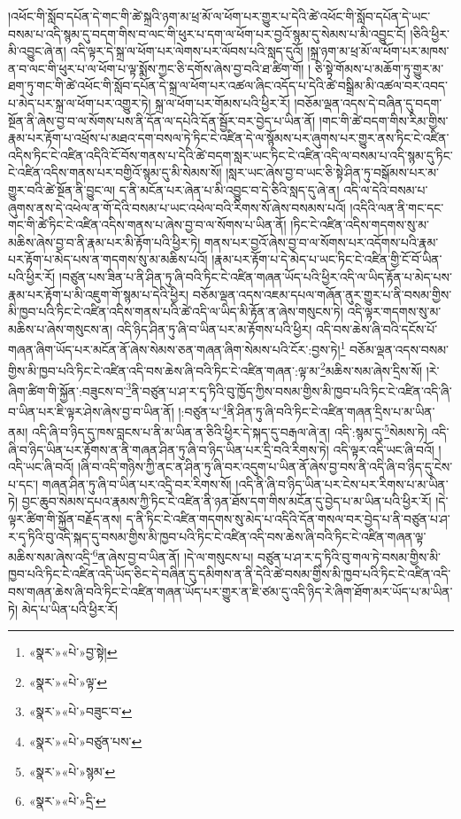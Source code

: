 །འཕོང་གི་སློབ་དཔོན་དེ་གང་གི་ཚེ་སྐྲའི་ཉག་མ་ཕྲ་མོ་ལ་ཕོག་པར་གྱུར་པ་དེའི་ཚེ་འཕོང་གི་སློབ་དཔོན་དེ་ཡང་བསམ་པ་འདི་སྙམ་དུ་བདག་གིས་བ་ལང་གི་ཕུར་པ་དག་ལ་ཕོག་པར་བྱའོ་སྙམ་དུ་སེམས་པ་མི་འབྱུང་ངོ། །ཅིའི་ཕྱིར་མི་འབྱུང་ཞེ་ན། འདི་ལྟར་དེ་སྐྲ་ལ་ཕོག་པར་ལེགས་པར་ལོབས་པའི་སླད་དུའོ། །སྐྲ་ཉག་མ་ཕྲ་མོ་ལ་ཕོག་པར་མཁས་ན་བ་ལང་གི་ཕུར་པ་ལ་ཕོག་པ་ལྟ་སྨོས་ཀྱང་ཅི་དགོས་ཞེས་བྱ་བའི་ཐ་ཚིག་གོ། །
ཅི་སྟེ་གོམས་པ་མཆོག་ཏུ་གྱུར་མ་ཐག་ཏུ་གང་གི་ཚེ་འཕོང་གི་སློབ་དཔོན་དེ་སྐྲ་ལ་ཕོག་པར་འཚལ་ཞིང་འདོད་པ་དེའི་ཚེ་བསྒྲིམ་མི་འཚལ་བར་འབད་པ་མེད་པར་སྐྲ་ལ་ཕོག་པར་འགྱུར་ཏེ། སྐྲ་ལ་ཕོག་པར་གོམས་པའི་ཕྱིར་རོ། །བཅོམ་ལྡན་འདས་དེ་བཞིན་དུ་བདག་སྔོན་ནི་ཞེས་བྱ་བ་ལ་སོགས་པས་ནི་དོན་ལ་དཔེའི་དོན་སྦྱོར་བར་བྱེད་པ་ཡིན་ནོ། །གང་གི་ཚེ་བདག་གིས་རིམ་གྱིས་རྣམ་པར་རྟོག་པ་འཕྲོས་པ་མཐའ་དག་བསལ་ཏེ་ཏིང་ངེ་འཛིན་དེ་ལ་སྙོམས་པར་ཞུགས་པར་གྱུར་ནས་ཏིང་ངེ་འཛིན་འདིས་ཏིང་ངེ་འཛིན་འདིའི་ངོ་བོས་གནས་པ་དེའི་ཚེ་བདག་སླར་ཡང་ཏིང་ངེ་འཛིན་འདི་ལ་བསམ་པ་འདི་སྙམ་དུ་ཏིང་ངེ་འཛིན་འདིས་གནས་པར་བགྱིའོ་སྙམ་དུ་མི་སེམས་སོ། །སླར་ཡང་ཞེས་བྱ་བ་ཡང་ཅི་སྟེ་ཤིན་ཏུ་བསྒོམས་པར་མ་གྱུར་བའི་ཚེ་སྔོན་ནི་བྱུང་ལ། ད་ནི་མངོན་པར་ཞེན་པ་མི་འབྱུང་བ་དེ་ཅིའི་སླད་དུ་ཞེ་ན། འདི་ལ་དེའི་བསམ་པ་ཞུགས་ནས་དེ་འཕེལ་ན་གོ་དེའི་བསམ་པ་ཡང་འཕེལ་བའི་རིགས་སོ་ཞེས་བསམས་པའོ། །འདིའི་ལན་ནི་གང་དང་གང་གི་ཚེ་ཏིང་ངེ་འཛིན་འདིས་གནས་པ་ཞེས་བྱ་བ་ལ་སོགས་པ་ཡིན་ནོ། །ཏིང་ངེ་འཛིན་འདིས་གདགས་སུ་མ་མཆིས་ཞེས་བྱ་བ་ནི་རྣམ་པར་མི་རྟོག་པའི་ཕྱིར་ཏེ། གནས་པར་བྱའོ་ཞེས་བྱ་བ་ལ་སོགས་པར་འདོགས་པའི་རྣམ་པར་རྟོག་པ་མེད་པས་ན་གདགས་སུ་མ་མཆིས་པའོ། །རྣམ་པར་རྟོག་པ་དེ་མེད་པ་ཡང་ཏིང་ངེ་འཛིན་གྱི་ངོ་བོ་ཡིན་པའི་ཕྱིར་རོ། །བཙུན་པས་ཟིན་པ་ནི་ཤིན་ཏུ་ཞི་བའི་ཏིང་ངེ་འཛིན་གཞན་ཡོད་པའི་ཕྱིར་འདི་ལ་ཡིད་རྟོན་པ་མེད་པས་རྣམ་པར་རྟོག་པ་མི་འཇུག་གོ་སྙམ་པ་དེའི་ཕྱིར། བཅོམ་ལྡན་འདས་འཇམ་དཔལ་གཞོན་ནུར་གྱུར་པ་ནི་བསམ་གྱིས་མི་ཁྱབ་པའི་ཏིང་ངེ་འཛིན་འདིས་གནས་པའི་ཚེ་འདི་ལ་ཡིད་མི་རྟོན་ན་ཞེས་གསུངས་ཏེ། འདི་ལྟར་གདགས་སུ་མ་མཆིས་པ་ཞེས་གསུངས་ན། འདི་ཉིད་ཤིན་ཏུ་ཞི་བ་ཡིན་པར་མ་རྟོགས་པའི་ཕྱིར། འདི་བས་ཆེས་ཞི་བའི་དངོས་པོ་གཞན་ཞིག་ཡོད་པར་མངོན་ནོ་ཞེས་སེམས་ཅན་གཞན་ཞིག་སེམས་པའི་ངོར་:བྱས་ཏེ།\footnote{«སྣར་»«པེ་»བྱ་སྟེ།} བཅོམ་ལྡན་འདས་བསམ་གྱིས་མི་ཁྱབ་པའི་ཏིང་ངེ་འཛིན་འདི་བས་ཆེས་ཞི་བའི་ཏིང་ངེ་འཛིན་གཞན་:ལྟ་མ་\footnote{«སྣར་»«པེ་»ལྟ་}མཆིས་སམ་ཞེས་དྲིས་སོ། །རེ་ཞིག་ཚིག་གི་སྐྱོན་:བཟུངས་བ་\footnote{«སྣར་»«པེ་»བཟུང་བ་}ནི་བཙུན་པ་ཤ་ར་དྭ་ཏིའི་བུ་ཁྱོད་ཀྱིས་བསམ་གྱིས་མི་ཁྱབ་པའི་ཏིང་ངེ་འཛིན་འདི་ཞི་བ་ཡིན་པར་ཇི་ལྟར་ཤེས་ཞེས་བྱ་བ་ཡིན་ནོ། །:བཙུན་པ་\footnote{«སྣར་»«པེ་»བཙུན་པས་}ནི་ཤིན་ཏུ་ཞི་བའི་ཏིང་ངེ་འཛིན་གཞན་དྲིས་པ་མ་ཡིན་ནམ། འདི་ཞི་བ་ཉིད་དུ་ཁས་བླངས་པ་ནི་མ་ཡིན་ན་ཅིའི་ཕྱིར་དེ་སྐད་དུ་བརྒལ་ཞེ་ན། འདི་:སྙམ་དུ་\footnote{«སྣར་»«པེ་»སྙམ་}སེམས་ཏེ། འདི་ཞི་བ་ཉིད་ཡིན་པར་རྟོགས་ན་ནི་གཞན་ཤིན་ཏུ་ཞི་བ་ཉིད་ཡིན་པར་དྲི་བའི་རིགས་ཏེ། འདི་ལྟར་འདི་ཡང་ཞི་བའོ། །འདི་ཡང་ཞི་བའོ། །ཞི་བ་འདི་གཉིས་ཀྱི་ནང་ན་ཤིན་ཏུ་ཞི་བར་འདུག་པ་ཡིན་ནོ་ཞེས་བྱ་བས་ནི་འདི་ཞི་བ་ཉིད་དུ་ངེས་པ་དང་། གཞན་ཤིན་ཏུ་ཞི་བ་ཡིན་པར་འདྲི་བར་རིགས་སོ། །འདི་ནི་ཞི་བ་ཉིད་ཡིན་པར་ངེས་པར་རིགས་པ་མ་ཡིན་ཏེ། བྱང་ཆུབ་སེམས་དཔའ་རྣམས་ཀྱི་ཏིང་ངེ་འཛིན་ནི་ཉན་ཐོས་དག་གིས་མངོན་དུ་བྱེད་པ་མ་ཡིན་པའི་ཕྱིར་རོ། །དེ་ལྟར་ཚིག་གི་སྐྱོན་བརྗོད་ནས། ད་ནི་ཏིང་ངེ་འཛིན་གདགས་སུ་མེད་པ་འདིའི་དོན་གསལ་བར་བྱེད་པ་ནི་བཙུན་པ་ཤ་ར་དྭ་ཏིའི་བུ་འདི་སྐད་དུ་བསམ་གྱིས་མི་ཁྱབ་པའི་ཏིང་ངེ་འཛིན་འདི་བས་ཆེས་ཞི་བའི་ཏིང་ངེ་འཛིན་གཞན་ལྟ་མཆིས་སམ་ཞེས་འདྲི་\footnote{«སྣར་»«པེ་»དྲི་}ན་ཞེས་བྱ་བ་ཡིན་ནོ། །དེ་ལ་གསུངས་པ། བཙུན་པ་ཤ་ར་དྭ་ཏིའི་བུ་གལ་ཏེ་བསམ་གྱིས་མི་ཁྱབ་པའི་ཏིང་ངེ་འཛིན་འདི་ཡོད་ཅིང་དེ་བཞིན་དུ་དམིགས་ན་ནི་དེའི་ཚེ་བསམ་གྱིས་མི་ཁྱབ་པའི་ཏིང་ངེ་འཛིན་འདི་བས་གཞན་ཆེས་ཞི་བའི་ཏིང་ངེ་འཛིན་གཞན་ཡོད་པར་གྱུར་ན་ཇི་ཙམ་དུ་འདི་ཉིད་རེ་ཞིག་ཐོག་མར་ཡོད་པ་མ་ཡིན་ཏེ། མེད་པ་ཡིན་པའི་ཕྱིར་རོ། 